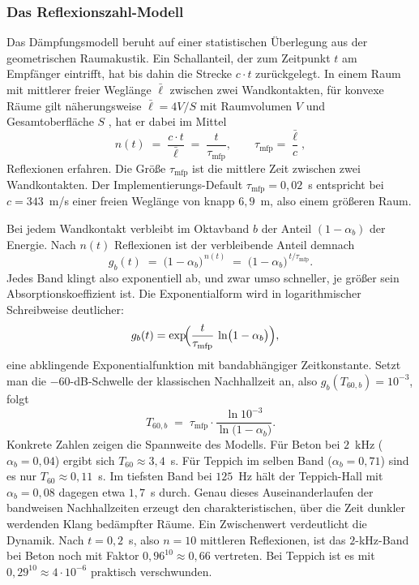 \subsubsection{Das Reflexionszahl-Modell}
\label{subsubsec:reflexionsmodell}

Das Dämpfungsmodell beruht auf einer statistischen Überlegung aus der
geometrischen Raumakustik. Ein Schallanteil, der zum Zeitpunkt $t$ am Empfänger
eintrifft, hat bis dahin die Strecke $c \cdot t$ zurückgelegt. In einem Raum mit
mittlerer freier Weglänge $\bar{\ell}$ zwischen zwei Wandkontakten, für konvexe
Räume gilt näherungsweise $\bar{\ell} = 4V/S$ mit Raumvolumen $V$ und
Gesamtoberfläche $S$ \parencite{kuttruff2016}, hat er dabei im Mittel
\[
    n(t) \;=\; \frac{c \cdot t}{\bar{\ell}} \;=\; \frac{t}{\tau_{\mathrm{mfp}}},
    \qquad \tau_{\mathrm{mfp}} = \frac{\bar{\ell}}{c},
\]
Reflexionen erfahren. Die Größe $\tau_{\mathrm{mfp}}$ ist die mittlere Zeit
zwischen zwei Wandkontakten. Der Implementierungs-Default
$\tau_{\mathrm{mfp}} = 0{,}02$~s entspricht bei $c = 343$~m/s einer freien
Weglänge von knapp $6{,}9$~m, also einem größeren Raum.

Bei jedem Wandkontakt verbleibt im Oktavband $b$ der Anteil $(1 - \alpha_b)$
der Energie. Nach $n(t)$ Reflexionen ist der verbleibende Anteil demnach
\[
    g_b(t)
    \;=\; \bigl(1 - \alpha_b\bigr)^{\,n(t)}
    \;=\; \bigl(1 - \alpha_b\bigr)^{\,t / \tau_{\mathrm{mfp}}}.
\]
Jedes Band klingt also exponentiell ab, und zwar umso schneller, je größer sein
Absorptionskoeffizient ist. Die Exponentialform wird in logarithmischer
Schreibweise deutlicher:
\begin{align*}
    g_b(t) &= \exp\!\Bigl(\frac{t}{\tau_{\mathrm{mfp}}}\,
    \ln\bigl(1 - \alpha_b\bigr)\Bigr),
\end{align*}
eine abklingende Exponentialfunktion mit bandabhängiger Zeitkonstante. Setzt man
die $-60$-dB-Schwelle der klassischen Nachhallzeit an, also
$g_b(T_{60,b}) = 10^{-3}$, folgt
\[
    T_{60,b} \;=\; \tau_{\mathrm{mfp}} \cdot
    \frac{\ln 10^{-3}}{\ln\bigl(1 - \alpha_b\bigr)}.
\]
Konkrete Zahlen zeigen die Spannweite des Modells. Für Beton bei $2$~kHz
($\alpha_b = 0{,}04$) ergibt sich $T_{60} \approx 3{,}4$~s. Für Teppich im selben
Band ($\alpha_b = 0{,}71$) sind es nur $T_{60} \approx 0{,}11$~s. Im tiefsten
Band bei $125$~Hz hält der Teppich-Hall mit $\alpha_b = 0{,}08$ dagegen etwa
$1{,}7$~s durch. Genau dieses Auseinanderlaufen der bandweisen Nachhallzeiten
erzeugt den charakteristischen, über die Zeit dunkler werdenden Klang bedämpfter
Räume. Ein Zwischenwert verdeutlicht die Dynamik. Nach $t = 0{,}2$~s, also
$n = 10$ mittleren Reflexionen, ist das $2$-kHz-Band bei Beton noch mit Faktor
$0{,}96^{10} \approx 0{,}66$ vertreten. Bei Teppich ist es mit
$0{,}29^{10} \approx 4 \cdot 10^{-6}$ praktisch verschwunden.


